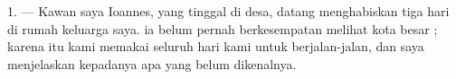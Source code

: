 %
%
%
%
%

\VUsaut{4.0mm}
\VUsaut{3.0mm}

\VUsaut{3.0mm}

1. --- Kawan saya Ioannes, yang tinggal di desa, datang menghabiskan
tiga hari di rumah keluarga saya.  ia belum
pernah berkesempatan melihat kota besar ; karena itu kami memakai
seluruh hari kami untuk berjalan-jalan, dan saya menjelaskan kepadanya
apa yang belum dikenalnya.


